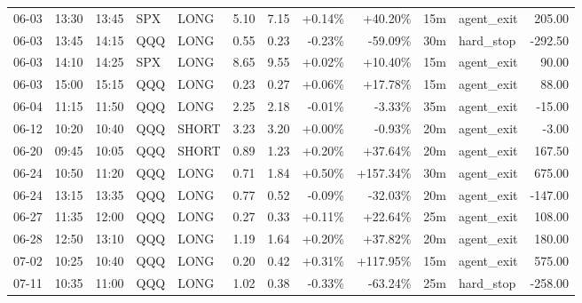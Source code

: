 \documentclass[11pt,a4paper]{article}
\begin{document}
\begin{center}
\begin{longtable}{>{\color{txtmain}}l l l l l r r r r r >{\color{txtmain}}l r}
06-03 & 13:30 & 13:45 & SPX & LONG & 5.10 & 7.15 & \textcolor{wingreen}{+0.14\%} & \textcolor{wingreen}{+40.20\%} & 15m & agent\_exit & \textcolor{wingreen}{205.00} \\
06-03 & 13:45 & 14:15 & QQQ & LONG & 0.55 & 0.23 & \textcolor{lossred}{-0.23\%} & \textcolor{lossred}{-59.09\%} & 30m & hard\_stop & \textcolor{lossred}{-292.50} \\
06-03 & 14:10 & 14:25 & SPX & LONG & 8.65 & 9.55 & \textcolor{wingreen}{+0.02\%} & \textcolor{wingreen}{+10.40\%} & 15m & agent\_exit & \textcolor{wingreen}{90.00} \\
06-03 & 15:00 & 15:15 & QQQ & LONG & 0.23 & 0.27 & \textcolor{wingreen}{+0.06\%} & \textcolor{wingreen}{+17.78\%} & 15m & agent\_exit & \textcolor{wingreen}{88.00} \\
06-04 & 11:15 & 11:50 & QQQ & LONG & 2.25 & 2.18 & \textcolor{lossred}{-0.01\%} & \textcolor{lossred}{-3.33\%} & 35m & agent\_exit & \textcolor{lossred}{-15.00} \\
06-12 & 10:20 & 10:40 & QQQ & SHORT & 3.23 & 3.20 & \textcolor{wingreen}{+0.00\%} & \textcolor{lossred}{-0.93\%} & 20m & agent\_exit & \textcolor{lossred}{-3.00} \\
06-20 & 09:45 & 10:05 & QQQ & SHORT & 0.89 & 1.23 & \textcolor{wingreen}{+0.20\%} & \textcolor{wingreen}{+37.64\%} & 20m & agent\_exit & \textcolor{wingreen}{167.50} \\
06-24 & 10:50 & 11:20 & QQQ & LONG & 0.71 & 1.84 & \textcolor{wingreen}{+0.50\%} & \textcolor{wingreen}{+157.34\%} & 30m & agent\_exit & \textcolor{wingreen}{675.00} \\
06-24 & 13:15 & 13:35 & QQQ & LONG & 0.77 & 0.52 & \textcolor{lossred}{-0.09\%} & \textcolor{lossred}{-32.03\%} & 20m & agent\_exit & \textcolor{lossred}{-147.00} \\
06-27 & 11:35 & 12:00 & QQQ & LONG & 0.27 & 0.33 & \textcolor{wingreen}{+0.11\%} & \textcolor{wingreen}{+22.64\%} & 25m & agent\_exit & \textcolor{wingreen}{108.00} \\
06-28 & 12:50 & 13:10 & QQQ & LONG & 1.19 & 1.64 & \textcolor{wingreen}{+0.20\%} & \textcolor{wingreen}{+37.82\%} & 20m & agent\_exit & \textcolor{wingreen}{180.00} \\
07-02 & 10:25 & 10:40 & QQQ & LONG & 0.20 & 0.42 & \textcolor{wingreen}{+0.31\%} & \textcolor{wingreen}{+117.95\%} & 15m & agent\_exit & \textcolor{wingreen}{575.00} \\
07-11 & 10:35 & 11:00 & QQQ & LONG & 1.02 & 0.38 & \textcolor{lossred}{-0.33\%} & \textcolor{lossred}{-63.24\%} & 25m & hard\_stop & \textcolor{lossred}{-258.00} \\

\end{longtable}
\end{center}
\end{document}
